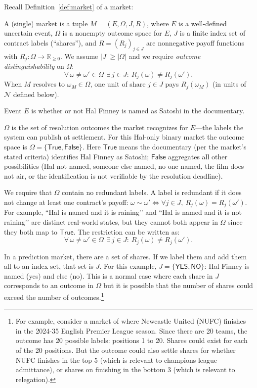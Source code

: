 Recall Definition~\ref{def:market} of a market: 

\begin{definition}[Market]
A (single) market is a tuple $M=(E,\Omega,J,R)$, where $E$ is a well-defined uncertain event, $\Omega$ is a nonempty outcome space for $E$, $J$ is a finite index set of contract labels (“shares”), and $R=(R_j)_{j\in J}$ are nonnegative payoff functions with $R_j:\Omega\to\mathbb{R}_{\ge 0}$. 
We assume $|J|\ge|\Omega|$ and we require \emph{outcome distinguishability} on $\Omega$:
\[
\forall\,\omega\neq\omega'\in\Omega\ \ \exists\,j\in J:\ R_j(\omega)\neq R_j(\omega').
\]
When $M$ resolves to $\omega_M\in\Omega$, one unit of share $j\in J$ pays $R_j(\omega_M)$ (in units of $\mathcal{N}$ defined below).
\end{definition}

Event $E$ is whether or not Hal Finney is named as Satoshi in the documentary.

$\Omega$ is the set of resolution outcomes the market recognizes for $E$—the labels the system can publish at settlement. For this Hal-only binary market the outcome space is $\Omega=\{\mathsf{True},\mathsf{False}\}$. Here $\mathsf{True}$ means the documentary (per the market’s stated criteria) identifies Hal Finney as Satoshi; $\mathsf{False}$ aggregates all other possibilities (Hal not named, someone else named, no one named, the film does not air, or the identification is not verifiable by the resolution deadline).


We require that $\Omega$ contain no redundant labels. A label is redundant if it does not change at least one contract’s payoff: $\omega\sim\omega' \iff \forall j\in J,\ R_j(\omega)=R_j(\omega')$. For example, “Hal is named and it is raining’’ and “Hal is named and it is not raining’’ are distinct real-world states, but they cannot both appear in $\Omega$ since they both map to $\mathsf{True}$. The restriction can be written as:
\[
\forall\,\omega\neq\omega'\in\Omega\ \ \exists\,j\in J:\ R_j(\omega)\neq R_j(\omega').
\]

In a prediction market, there are a set of shares. If we label them and add them all to an index set, that set is $J$. For this example, $J=\{\textsf{YES},\textsf{NO}\}$: Hal Finney is named (yes) and else (no). This is a normal case where each share in $J$ corresponds to an outcome in $\Omega$ but it is possible that the number of shares could exceed the number of outcomes.\footnote{For example, consider a market of where Newcastle United (NUFC) finishes in the 2024-35 English Premier League season. Since there are 20 teams, the outcome has 20 possible labels: positions 1 to 20. Shares could exist for each of the 20 positions. But the outcome could also settle shares for whether NUFC finishes in the top 5 (which is relevant to champions league admittance), or shares on finishing in the bottom 3 (which is relevant to relegation).}

